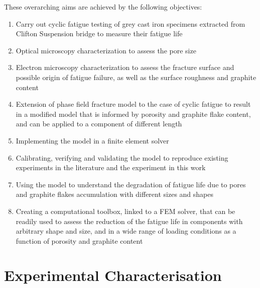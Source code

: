 \documentclass[11pt,a4paper]{article}
\begin{document}
These overarching aims are achieved by the following objectives:
\vspace{-2mm}
\begin{enumerate}
\setlength\itemsep{-0.2em}
\item\label{O1} Carry out cyclic fatigue testing of grey cast iron specimens extracted from Clifton Suspension bridge to measure their fatigue life
\item\label{O2} Optical microscopy characterization to assess the pore size
\item\label{O3} Electron microscopy characterization to assess the fracture surface and possible origin of fatigue failure, as well as the surface roughness and graphite content
\item\label{O4} Extension of phase field fracture model to the case of cyclic fatigue to result in a modified model that is informed by porosity and graphite flake content, and can be applied to a component of different length
\item\label{O5} Implementing the model in a finite element solver
\item\label{O6} Calibrating, verifying and validating the model to reproduce existing experiments in the literature and the experiment in this work
\item\label{O7} Using the model to understand the degradation of fatigue life due to pores and graphite flakes accumulation with different sizes and shapes
\item\label{O8} Creating a computational toolbox, linked to a FEM solver, that can be readily used to assess the reduction of the fatigue life in components with arbitrary shape and size, and in a wide range of loading conditions as a function of porosity and graphite content
\end{enumerate}

\section{Experimental Characterisation}
\end{document}
